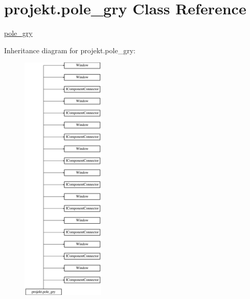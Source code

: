 \hypertarget{classprojekt_1_1pole__gry}{}\section{projekt.\+pole\+\_\+gry Class Reference}
\label{classprojekt_1_1pole__gry}


\mbox{\hyperlink{classprojekt_1_1pole__gry}{pole\+\_\+gry}}  


Inheritance diagram for projekt.\+pole\+\_\+gry\+:\begin{figure}[H]
\begin{center}
\leavevmode
\includegraphics[height=12.000000cm]{classprojekt_1_1pole__gry}
\end{center}
\end{figure}

